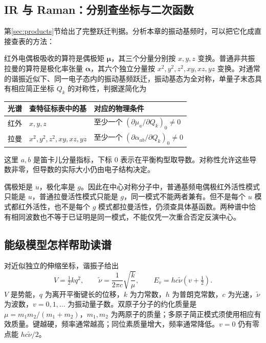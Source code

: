 \subsection{IR 与 Raman：分别查坐标与二次函数}

第\ref{sec:products}节给出了完整跃迁判据。分析本章的振动基频时，可以把它化成直接查表的方法：

红外电偶极吸收的算符是偶极矩 $\symbf{\mu}$，其三个分量分别按 $x,y,z$ 变换。普通非共振拉曼的算符是极化率张量 $\symbf{\alpha}$，其六个独立分量按 $x^2,y^2,z^2,xy,xz,yz$ 变换。对通常的谐振近似下、同一电子态内的振动基频跃迁，振动基态为全对称，单量子末态具有相应简正坐标 $Q_k$ 的对称性，判据遂简化为
\begin{center}
\small
\begin{tabularx}{\linewidth}{lXX}
\toprule
光谱 & 查特征标表中的基 & 对应的物理条件\\
\midrule
红外 & $x,y,z$ & 至少一个 $(\partial\mu_a/\partial Q_k)_0\ne0$\\
拉曼 & $x^2,y^2,z^2,xy,xz,yz$ & 至少一个 $(\partial\alpha_{ab}/\partial Q_k)_0\ne0$\\
\bottomrule
\end{tabularx}
\end{center}
这里 $a,b$ 是笛卡儿分量指标，下标 0 表示在平衡构型取导数。对称性允许这些导数非零，但导数的实际大小仍由电子结构决定。

\begin{keyidea}[有反演中心时的互斥规则]
偶极矩是 $u$，极化率是 $g$。因此在中心对称分子中，普通基频电偶极红外活性模式只能是 $u$，普通拉曼活性模式只能是 $g$，同一模式不能两者兼有。但不是每个 $u$ 模式都红外活性，也不是每个 $g$ 模式都拉曼活性，仍须查具体基函数。两种谱中恰有相同波数也不等于已证明是同一模式，不能仅凭一次重合否定反演中心。
\end{keyidea}

\subsection{能级模型怎样帮助读谱}

对近似独立的伸缩坐标，谐振子给出
\[
V=\tfrac12 kq^2,\qquad
\widetilde\nu=\frac{1}{2\pi c}\sqrt{\frac{k}{\mu}},\qquad
E_v=hc\widetilde\nu\left(v+\tfrac12\right).
\]
$V$ 是势能，$q$ 为离开平衡键长的位移，$k$ 为力常数，$h$ 为普朗克常数，$c$ 为光速，$\widetilde\nu$ 为波数，$v=0,1,\ldots$ 为振动量子数。双原子分子的约化质量是 $\mu=m_1m_2/(m_1+m_2)$，$m_1,m_2$ 为两原子的质量；多原子简正模式须使用相应有效质量。键越硬，频率通常越高；同位素质量增大，频率通常降低。$v=0$ 仍有零点能 $hc\widetilde\nu/2$。

